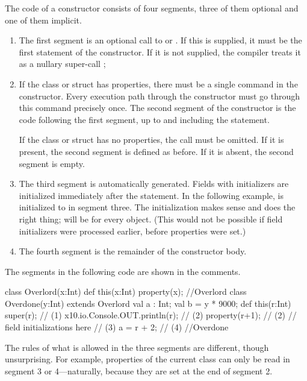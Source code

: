 The code of a constructor consists of four segments, three of them optional
and one of them implicit.
\begin{enumerate}
\item The first segment is an optional call to  or
      .  If this is supplied, it must be the first statement
      of the constructor.  If it is not supplied, the compiler treats it as a
      nullary super-call ;
\item If the class or struct has properties, there must be a single
       command in the constructor.  Every execution path
      through the constructor must go through this  command
      precisely once.   The second segment of the constructor is the code
      following the first segment, up to and including the 
      statement.  

      If the class or struct has no properties, the  call must
      be omitted. If it is present, the second segment is defined as before.  If
      it is absent, the second segment is empty.
\item The third segment is automatically generated.  Fields with initializers
      are initialized immediately after the  statement.  
      In the following example,  is initialized to  in
      segment three.  The initialization makes sense and does the right
      thing;  will be  for every  object. 
      (This would not be possible if field initializers were processed
      earlier, before properties were set.)
\item The fourth segment is the remainder of the constructor body.
\end{enumerate}

The segments in the following code are shown in the comments.
\begin{xten}
class Overlord(x:Int) {
  def this(x:Int) { property(x); }
}//Overlord
class Overdone(y:Int) extends Overlord  {
  val a : Int;
  val b =  y * 9000;
  def this(r:Int) {
    super(r);                      // (1)
    x10.io.Console.OUT.println(r); // (2)
    property(r+1);                 // (2)
    // field initializations here  // (3)
    a = r + 2;                     // (4)
  }
}//Overdone
\end{xten}
%

The rules of what is allowed in the three segments are different, though
unsurprising.  For example, properties of the current class can only be read
in segment 3 or 4---naturally, because they are set at the end of segment 2.  

